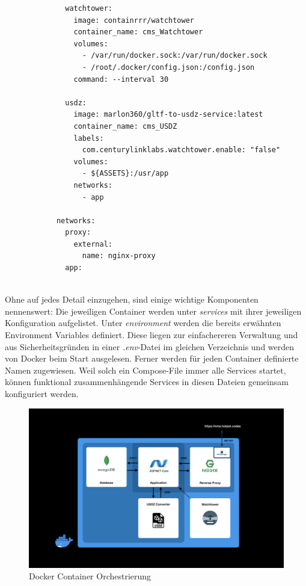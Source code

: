 \documentclass[titlepage, a4paper, 11pt]{scrartcl}
\begin{document}
\begin{lstlisting}
              watchtower:
                image: containrrr/watchtower
                container_name: cms_Watchtower
                volumes:
                  - /var/run/docker.sock:/var/run/docker.sock
                  - /root/.docker/config.json:/config.json
                command: --interval 30
                
              usdz:
                image: marlon360/gltf-to-usdz-service:latest
                container_name: cms_USDZ
                labels:
                  com.centurylinklabs.watchtower.enable: "false"
                volumes:
                  - ${ASSETS}:/usr/app
                networks:
                  - app
            
            networks:
              proxy:
                external:
                  name: nginx-proxy
              app:
            
          \end{lstlisting}

          Ohne auf jedes Detail einzugehen, sind einige wichtige Komponenten nennenswert: Die jeweiligen Container werden unter \textit{services} mit ihrer jeweiligen Konfiguration aufgelistet.
          Unter \textit{environment} werden die bereits erwähnten Environment Variables definiert. Diese liegen zur einfachereren Verwaltung und aus Sicherheitsgründen in einer \textit{.env}-Datei
          im gleichen Verzeichnis und werden von Docker beim Start ausgelesen. Ferner werden für jeden Container definierte Namen zugewiesen. Weil solch ein Compose-File immer alle Services startet,
          können funktional zusammenhängende Services in diesen Dateien gemeinsam konfiguriert werden.

          \begin{figure}[H]
            \centering
            \includegraphics[width=.8\textwidth]{DCompose.png}
            \caption{Docker Container Orchestrierung}
            \label{pipeline}
          \end{figure}
\end{document}
